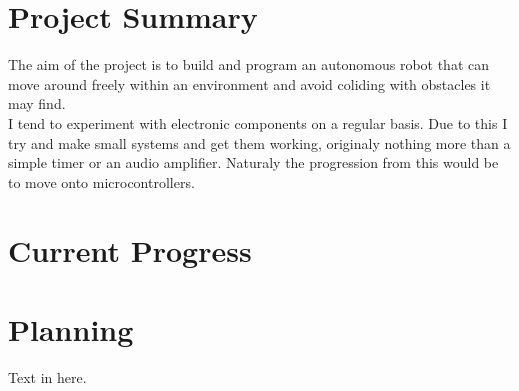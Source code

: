 \documentclass[11pt,fleqn,twoside]{article}
\begin{document}
\wordcount{}

\mmp

\setcounter{tocdepth}{3} %
\tableofcontents

\newpage

\section{Project Summary}
The aim of the project is to build and program an autonomous robot that can move around freely within an environment and avoid coliding with obstacles it may find.
\\I tend to experiment with electronic components on a regular basis.  Due to this I try and make small systems and get them working, originaly nothing more than a simple timer or an audio amplifier.  Naturaly the progression from this would be to move onto microcontrollers.
\\

\section{Current Progress}


\section{Planning}
Text in here.


\nocite{*} %

\newpage
{}
\end{document}
